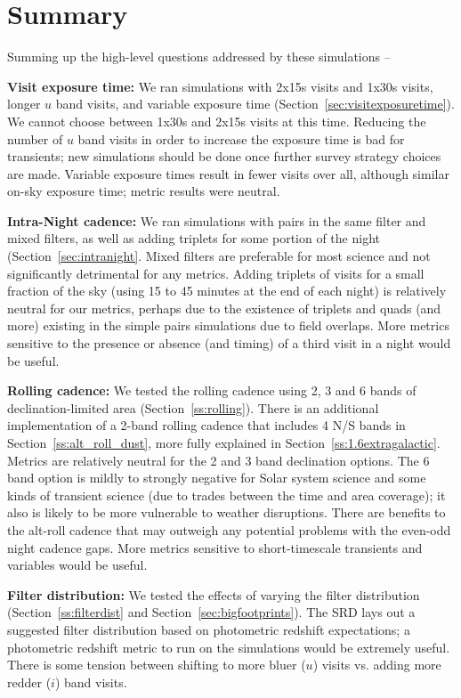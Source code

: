 \section{Summary}

Summing up the high-level questions addressed by these simulations --

{\bf Visit exposure time:}  We ran simulations with 2x15s visits and 1x30s visits, longer $u$ band visits, and variable exposure time (Section~\ref{sec:visitexposuretime}). We cannot choose between 1x30s and 2x15s visits at this time. Reducing the number of $u$ band visits in order to increase the exposure time is bad for transients; new simulations should be done once further survey strategy choices are made. Variable exposure times result in fewer visits over all, although similar on-sky exposure time; metric results were neutral. 

{\bf Intra-Night cadence:} We ran simulations with pairs in the same filter and mixed filters, as well as adding triplets for some portion of the night (Section~\ref{sec:intranight}. Mixed filters are preferable for most science and not significantly detrimental for any metrics. Adding triplets of visits for a small fraction of the sky (using 15 to 45 minutes at the end of each night) is relatively neutral for our metrics, perhaps due to the existence of triplets and quads (and more) existing in the simple pairs simulations due to field overlaps. More metrics sensitive to the presence or absence (and timing) of a third visit in a night would be useful.

{\bf Rolling cadence:} We tested the rolling cadence using 2, 3 and 6 bands of declination-limited area (Section~\ref{ss:rolling}). There is an additional implementation of a 2-band rolling cadence that includes 4 N/S bands in Section~\ref{ss:alt_roll_dust}, more fully explained in Section~\ref{ss:1.6extragalactic}. Metrics are relatively neutral for the 2 and 3 band declination options. The 6 band option is mildly to strongly negative for Solar system science and some kinds of transient science (due to trades between the time and area coverage); it also is likely to be more vulnerable to weather disruptions. There are benefits to the alt-roll cadence that may outweigh any potential problems with the even-odd night cadence gaps. More metrics sensitive to short-timescale transients and variables would be useful. 

{\bf Filter distribution:} We tested the effects of varying the filter distribution (Section~\ref{ss:filterdist} and Section~\ref{sec:bigfootprints}). The SRD lays out a suggested filter distribution based on photometric redshift expectations; a photometric redshift metric to run on the simulations would be extremely useful. There is some tension between shifting to more bluer ($u$) visits vs. adding more redder ($i$) band visits. 

